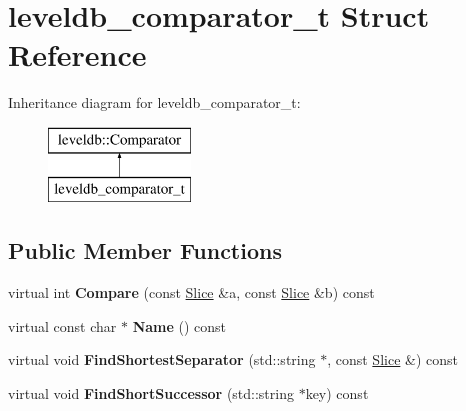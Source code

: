 \hypertarget{structleveldb__comparator__t}{}\section{leveldb\+\_\+comparator\+\_\+t Struct Reference}
\label{structleveldb__comparator__t}
Inheritance diagram for leveldb\+\_\+comparator\+\_\+t\+:\begin{figure}[H]
\begin{center}
\leavevmode
\includegraphics[height=2.000000cm]{structleveldb__comparator__t}
\end{center}
\end{figure}
\subsection*{Public Member Functions}
\begin{DoxyCompactItemize}
\item 
\mbox{\label{structleveldb__comparator__t_abad34abeefd52bcfd421e14f426f6d05}} 
virtual int {\bfseries Compare} (const \mbox{\hyperlink{classleveldb_1_1_slice}{Slice}} \&a, const \mbox{\hyperlink{classleveldb_1_1_slice}{Slice}} \&b) const
\item 
\mbox{\label{structleveldb__comparator__t_aaf7e79d77687d0542037ae5310296180}} 
virtual const char $\ast$ {\bfseries Name} () const
\item 
\mbox{\label{structleveldb__comparator__t_ad5bc952c5129d060c1ffe7a830eb3820}} 
virtual void {\bfseries Find\+Shortest\+Separator} (std\+::string $\ast$, const \mbox{\hyperlink{classleveldb_1_1_slice}{Slice}} \&) const
\item 
\mbox{\label{structleveldb__comparator__t_a46671a92506b28d1df61125499df3d23}} 
virtual void {\bfseries Find\+Short\+Successor} (std\+::string $\ast$key) const
\end{DoxyCompactItemize}
